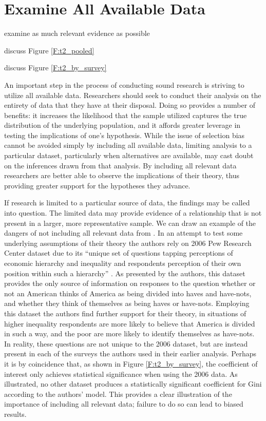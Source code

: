 
\section{Examine All Available Data}

examine as much relevant evidence as possible

discuss Figure \ref{F:t2_pooled}

discuss Figure \ref{F:t2_by_survey}

An important step in the process of conducting sound research is striving to utilize all available data. Researchers should seek to conduct their analysis on the entirety of data that they have at their disposal. Doing so provides a number of benefits:  it increases the likelihood that the sample utilized captures the true distribution of the underlying population, and it affords greater leverage in testing the implications of one’s hypothesis. While the issue of selection bias cannot be avoided simply by including all available data, limiting analysis to a particular dataset, particularly when alternatives are available, may cast doubt on the inferences drawn from that analysis. By including all relevant data researchers are better able to observe the implications of their theory, thus providing greater support for the hypotheses they advance.

If research is limited to a particular source of data, the findings may be called into question. The limited data may provide evidence of a relationship that is not present in a larger, more representative sample. We can draw an example of the dangers of not including all relevant data from \citet{Newman2015}.  In an attempt to test some underlying assumptions of their theory the authors rely on 2006 Pew Research Center dataset due to its ``unique set of questions tapping perceptions of economic hierarchy and inequality and respondents perception of their own position within such a hierarchy'' \citep[336]{Newman2015}. As presented by the authors, this dataset provides the only source of information on responses to the question whether or not an American thinks of America as being divided into haves and have-nots, and whether they think of themselves as being haves or have-nots. Employing this dataset the authors find further support for their theory, in situations of higher inequality respondents are more likely to believe that America is divided in such a way, and the poor are more likely to identify themselves as have-nots. In reality, these questions are not unique to the 2006 dataset, but are instead present in each of the surveys the authors used in their earlier analysis. Perhaps it is by coincidence that, as shown in Figure \ref{F:t2_by_survey}, the coefficient of interest only achieves statistical significance when using the 2006 data. As illustrated, no other dataset produces a statistically significant coefficient for Gini according to the authors’ model. This provides a clear illustration of the importance of including all relevant data; failure to do so can lead to biased results.

